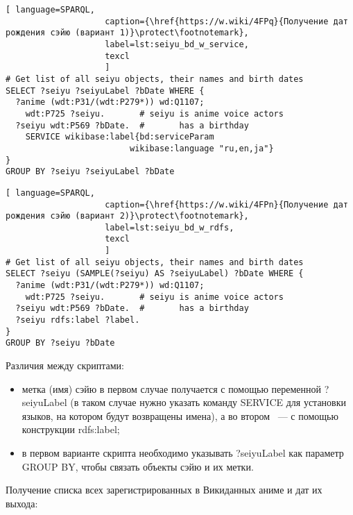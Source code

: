 \begin{lstlisting}[ language=SPARQL, 
                    caption={\href{https://w.wiki/4FPq}{Получение дат рождения сэйю (вариант 1)}\protect\footnotemark},
                    label=lst:seiyu_bd_w_service,
                    texcl 
                    ]
# Get list of all seiyu objects, their names and birth dates
SELECT ?seiyu ?seiyuLabel ?bDate WHERE {
  ?anime (wdt:P31/(wdt:P279*)) wd:Q1107;
    wdt:P725 ?seiyu.       # seiyu is anime voice actors
  ?seiyu wdt:P569 ?bDate.  #       has a birthday
    SERVICE wikibase:label{bd:serviceParam
					     wikibase:language "ru,en,ja"}
}
GROUP BY ?seiyu ?seiyuLabel ?bDate
\end{lstlisting}%

\begin{lstlisting}[ language=SPARQL, 
                    caption={\href{https://w.wiki/4FPn}{Получение дат рождения сэйю (вариант 2)}\protect\footnotemark},
                    label=lst:seiyu_bd_w_rdfs,
                    texcl 
                    ]
# Get list of all seiyu objects, their names and birth dates
SELECT ?seiyu (SAMPLE(?seiyu) AS ?seiyuLabel) ?bDate WHERE {
  ?anime (wdt:P31/(wdt:P279*)) wd:Q1107;
    wdt:P725 ?seiyu.       # seiyu is anime voice actors
  ?seiyu wdt:P569 ?bDate.  #       has a birthday 
  ?seiyu rdfs:label ?label.
}
GROUP BY ?seiyu ?bDate
\end{lstlisting}%

Различия между скриптами:

\begin{itemize}
    \item метка (имя) сэйю в первом случае получается с помощью переменной ?seiyuLabel (в таком случае нужно указать команду SERVICE для установки языков, на котором будут возвращены имена), а во втором ~--- с помощью конструкции rdfs:label;
    \item в первом варианте скрипта необходимо указывать ?seiyuLabel как параметр GROUP BY, чтобы связать объекты сэйю и их метки.
\end{itemize}

Получение списка всех зарегистрированных в Викиданных аниме и дат их выхода: 

